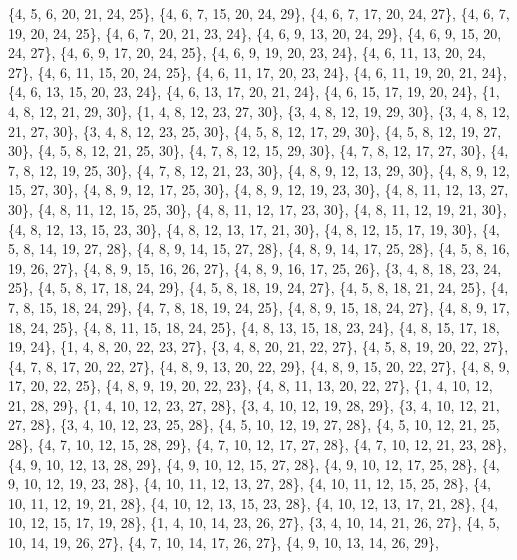 \documentclass[11pt,a4paper]{article}
\begin{document}
{\{4, 5, 6, 20, 21, 24, 25\}, \{4, 6, 7, 15, 20, 24, 29\}, \{4, 6, 7, 17, 20, 24, 27\}, \{4, 6, 7, 19, 20, 24, 25\}, \{4, 6, 7, 20, 21, 23, 24\},
\{4, 6, 9, 13, 20, 24, 29\}, \{4, 6, 9, 15, 20, 24, 27\}, \{4, 6, 9, 17, 20, 24, 25\}, \{4, 6, 9, 19, 20, 23, 24\}, \{4, 6, 11, 13, 20, 24, 27\},
\{4, 6, 11, 15, 20, 24, 25\}, \{4, 6, 11, 17, 20, 23, 24\}, \{4, 6, 11, 19, 20, 21, 24\}, \{4, 6, 13, 15, 20, 23, 24\}, \{4, 6, 13, 17, 20, 21, 24\},
\{4, 6, 15, 17, 19, 20, 24\}, \{1, 4, 8, 12, 21, 29, 30\}, \{1, 4, 8, 12, 23, 27, 30\}, \{3, 4, 8, 12, 19, 29, 30\}, \{3, 4, 8, 12, 21, 27, 30\},
\{3, 4, 8, 12, 23, 25, 30\}, \{4, 5, 8, 12, 17, 29, 30\}, \{4, 5, 8, 12, 19, 27, 30\}, \{4, 5, 8, 12, 21, 25, 30\}, \{4, 7, 8, 12, 15, 29, 30\},
\{4, 7, 8, 12, 17, 27, 30\}, \{4, 7, 8, 12, 19, 25, 30\}, \{4, 7, 8, 12, 21, 23, 30\}, \{4, 8, 9, 12, 13, 29, 30\}, \{4, 8, 9, 12, 15, 27, 30\},
\{4, 8, 9, 12, 17, 25, 30\}, \{4, 8, 9, 12, 19, 23, 30\}, \{4, 8, 11, 12, 13, 27, 30\}, \{4, 8, 11, 12, 15, 25, 30\}, \{4, 8, 11, 12, 17, 23, 30\},
\{4, 8, 11, 12, 19, 21, 30\}, \{4, 8, 12, 13, 15, 23, 30\}, \{4, 8, 12, 13, 17, 21, 30\}, \{4, 8, 12, 15, 17, 19, 30\}, \{4, 5, 8, 14, 19, 27, 28\},
\{4, 8, 9, 14, 15, 27, 28\}, \{4, 8, 9, 14, 17, 25, 28\}, \{4, 5, 8, 16, 19, 26, 27\}, \{4, 8, 9, 15, 16, 26, 27\}, \{4, 8, 9, 16, 17, 25, 26\},
\{3, 4, 8, 18, 23, 24, 25\}, \{4, 5, 8, 17, 18, 24, 29\}, \{4, 5, 8, 18, 19, 24, 27\}, \{4, 5, 8, 18, 21, 24, 25\}, \{4, 7, 8, 15, 18, 24, 29\},
\{4, 7, 8, 18, 19, 24, 25\}, \{4, 8, 9, 15, 18, 24, 27\}, \{4, 8, 9, 17, 18, 24, 25\}, \{4, 8, 11, 15, 18, 24, 25\}, \{4, 8, 13, 15, 18, 23, 24\},
\{4, 8, 15, 17, 18, 19, 24\}, \{1, 4, 8, 20, 22, 23, 27\}, \{3, 4, 8, 20, 21, 22, 27\}, \{4, 5, 8, 19, 20, 22, 27\}, \{4, 7, 8, 17, 20, 22, 27\},
\{4, 8, 9, 13, 20, 22, 29\}, \{4, 8, 9, 15, 20, 22, 27\}, \{4, 8, 9, 17, 20, 22, 25\}, \{4, 8, 9, 19, 20, 22, 23\}, \{4, 8, 11, 13, 20, 22, 27\},
\{1, 4, 10, 12, 21, 28, 29\}, \{1, 4, 10, 12, 23, 27, 28\}, \{3, 4, 10, 12, 19, 28, 29\}, \{3, 4, 10, 12, 21, 27, 28\}, \{3, 4, 10, 12, 23, 25, 28\},
\{4, 5, 10, 12, 19, 27, 28\}, \{4, 5, 10, 12, 21, 25, 28\}, \{4, 7, 10, 12, 15, 28, 29\}, \{4, 7, 10, 12, 17, 27, 28\}, \{4, 7, 10, 12, 21, 23, 28\},
\{4, 9, 10, 12, 13, 28, 29\}, \{4, 9, 10, 12, 15, 27, 28\}, \{4, 9, 10, 12, 17, 25, 28\}, \{4, 9, 10, 12, 19, 23, 28\}, \{4, 10, 11, 12, 13, 27, 28\},
\{4, 10, 11, 12, 15, 25, 28\}, \{4, 10, 11, 12, 19, 21, 28\}, \{4, 10, 12, 13, 15, 23, 28\}, \{4, 10, 12, 13, 17, 21, 28\}, \{4, 10, 12, 15, 17, 19, 28\},
\{1, 4, 10, 14, 23, 26, 27\}, \{3, 4, 10, 14, 21, 26, 27\}, \{4, 5, 10, 14, 19, 26, 27\}, \{4, 7, 10, 14, 17, 26, 27\}, \{4, 9, 10, 13, 14, 26, 29\},
}
\end{document}
